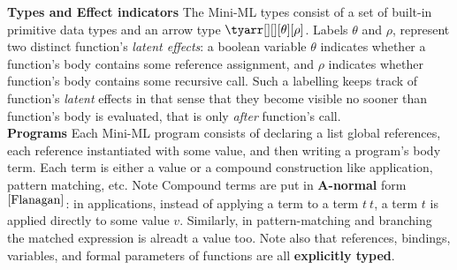 \documentclass[a4paper,11pt,oneside]{article}
\theoremstyle{plain}
\begin{document}
\noindent	\textbf{Types and Effect indicators}	\indent  
	The Mini-ML types consist of a set of built-in primitive data types and an arrow type $\tyarr[][][\theta][\rho]$. 
	Labels $\theta$ and $\rho$, represent two distinct function's \textit{latent effects}:
	a boolean variable $\theta$ indicates whether a function's body contains some reference assignment, and $\rho$ indicates whether function's body contains some recursive call.
	Such a labelling keeps track of function's \textit{latent} effects in that sense that they become visible no sooner than function's body is evaluated, that is only \textit{after} function's call.\\
	
\noindent	\textbf{Programs}	\indent  
	Each Mini-ML program consists of declaring a list global references, each reference instantiated with some value, and then writing a program's body term. 
	Each term is either a value or a compound construction like application, pattern matching, etc. 
	Note Compound terms are put in \textbf{A-normal} form$^{\cite{Flanagan}}$: in applications, instead of applying a term to a term $t~t$, a term $t$ is applied directly to some value $v$. 
	Similarly, in pattern-matching and branching the matched expression is alreadt a value too. 
%	
	Note also that references, bindings, variables, and formal parameters of functions are all \textbf{explicitly typed}. \\
	
\end{document}

